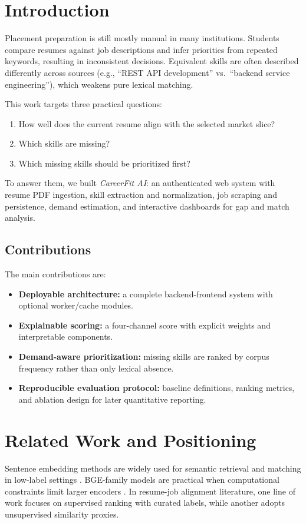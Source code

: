 \documentclass[conference]{IEEEtran}
\begin{document}
\section{Introduction}
Placement preparation is still mostly manual in many institutions. Students compare resumes against job descriptions and infer priorities from repeated keywords, resulting in inconsistent decisions. Equivalent skills are often described differently across sources (e.g., ``REST API development'' vs.\ ``backend service engineering''), which weakens pure lexical matching.

This work targets three practical questions:
\begin{enumerate}
    \item How well does the current resume align with the selected market slice?
    \item Which skills are missing?
    \item Which missing skills should be prioritized first?
\end{enumerate}

To answer them, we built \textit{CareerFit AI}: an authenticated web system with resume PDF ingestion, skill extraction and normalization, job scraping and persistence, demand estimation, and interactive dashboards for gap and match analysis.

\subsection{Contributions}
The main contributions are:
\begin{itemize}
    \item \textbf{Deployable architecture:} a complete backend-frontend system with optional worker/cache modules.
    \item \textbf{Explainable scoring:} a four-channel score with explicit weights and interpretable components.
    \item \textbf{Demand-aware prioritization:} missing skills are ranked by corpus frequency rather than only lexical absence.
    \item \textbf{Reproducible evaluation protocol:} baseline definitions, ranking metrics, and ablation design for later quantitative reporting.
\end{itemize}

\section{Related Work and Positioning}
Sentence embedding methods are widely used for semantic retrieval and matching in low-label settings \cite{b1}. BGE-family models are practical when computational constraints limit larger encoders \cite{b2}. In resume-job alignment literature, one line of work focuses on supervised ranking with curated labels, while another adopts unsupervised similarity proxies.
\end{document}
